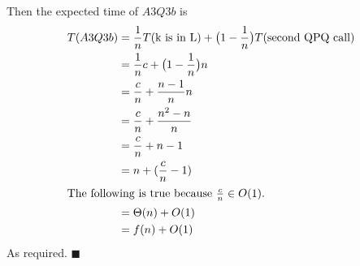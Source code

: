 \documentclass[12pt]{article}
\begin{document}
\begin{enumerate}[(a)]
Then the expected time of $A3Q3b$ is
\begin{align*}
T(A3Q3b) &= \frac{1}{n}T(\text{k is in L}) + \big (1-\frac{1}{n} \big ) T(\text{second QPQ call})\\
	&= \frac{1}{n} c + \big (1-\frac{1}{n} \big ) n\\
	&= \frac{c}{n} + \frac{n-1}{n} n\\
	&= \frac{c}{n} + \frac{n^2 -n}{n}\\
	&= \frac{c}{n} + n - 1\\
	&= n + (\frac{c}{n}-1)\\
\intertext{The following is true because $\frac{c}{n} \in O(1)$.}
	&= \Theta(n) + O(1)\\
	&= f(n) + O(1)
\end{align*}
As required.
\hfill $\blacksquare$

\end{enumerate}
\end{document}
